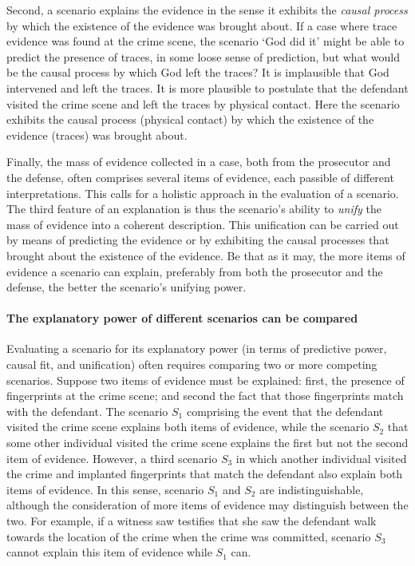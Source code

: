 \documentclass[10pt]{article}
\begin{document}
Second, a scenario explains the evidence in the sense it exhibits the \textit{causal process} by which the existence of the evidence 
was brought about. If a case where trace evidence was found at the crime scene, the scenario `God did it' might be able to predict the 
presence of traces, in some loose sense of prediction, but what would be the causal process by which God left the traces?  It is implausible that God intervened 
and left the traces. It is more plausible to postulate that the defendant visited the crime scene and left the traces by physical contact. Here the scenario exhibits the causal process (physical contact) by which the existence of the evidence (traces) was brought about. 

Finally, the mass of evidence collected in a case, both from the prosecutor and the defense, often comprises several items of evidence, each passible of different interpretations. This calls for a holistic approach in the evaluation of a scenario. The third feature of an explanation is thus the scenario's ability to \textit{unify} the mass of evidence into a coherent description. This unification can be carried out by means of predicting the evidence or by exhibiting the causal processes that brought about the existence of the evidence. Be that as it may, the more items of evidence a scenario can explain, preferably from both the prosecutor and the defense, 
the better the scenario's unifying power. 

\paragraph{The explanatory power of different scenarios can be compared}

Evaluating a scenario for its explanatory power (in terms of predictive power, causal fit, and unification) often requires comparing two or more competing scenarios. 
Suppose two items of evidence must be explained: first, the presence of fingerprints at the crime scene; and second the fact that those fingerprints match with the defendant.  The scenario $S_1$ comprising the event that the defendant visited the crime scene explains both items of evidence, while the scenario $S_2$ that some other individual visited the crime scene explains the first but not the second item of evidence. However, a third scenario $S_3$ in which another individual visited the crime and  implanted fingerprints that match the defendant also explain both items of evidence. In this sense, scenario $S_1$ and $S_2$ are indistinguishable, although the consideration of more items of evidence may distinguish between the two. For example, if a witness saw testifies that she saw the defendant walk towards the location of the crime when the crime was committed, scenario $S_3$ cannot explain this item of evidence while $S_1$ can. 
\end{document}
